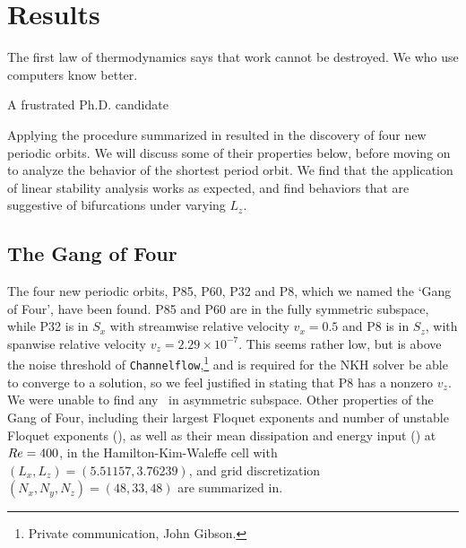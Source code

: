 \chapter{Results}
\epigraph{The first law of thermodynamics says that work cannot be destroyed. We who use computers know better.}{A frustrated Ph.D. candidate}

Applying the procedure summarized in  resulted in the discovery of four new periodic orbits. We will discuss some of their properties below, before moving on to analyze the behavior of the shortest period orbit. We find that the application of linear stability analysis works as expected, and find behaviors that are suggestive of bifurcations under varying $L_z$.   
\section{The Gang of Four}

The four new periodic orbits, P85, P60, P32 and P8, which we named the `Gang of Four', have been found.  P85 and P60 are in the fully symmetric subspace, while P32 is in $S_x$ with streamwise relative velocity $v_x = 0.5$ and P8 is in $S_z$, with spanwise relative velocity $v_z = 2.29\times 10^{-7}$. This seems rather low, but is above the noise threshold of {\tt Channelflow},\footnote{Private communication, John Gibson.} and is required for the NKH solver be able to converge to a solution, so we feel justified in stating that P8 has a nonzero $v_z$. We were unable to find any \ecs\ in asymmetric subspace. Other properties of the Gang of Four, including their largest Floquet exponents and number of unstable Floquet exponents (), as well as their mean dissipation and energy input () at  $Re = 400$, in the Hamilton-Kim-Waleffe cell with $(L_x,L_z) = (5.51157, 3.76239)$, and grid discretization $(N_x,N_y,N_z)= (48,33,48)$  are summarized in. 

